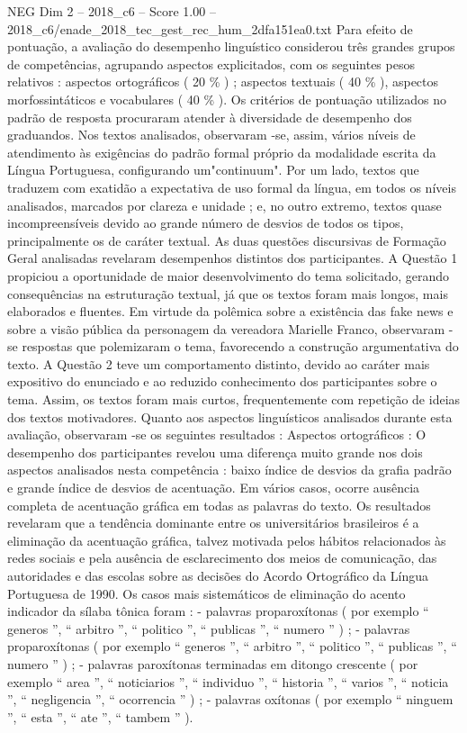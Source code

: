 \begin{textsample}{NEG Dim 2 – 2018\_c6 – Score 1.00 – 2018\_c6/enade\_2018\_tec\_gest\_rec\_hum\_2dfa151ea0.txt}
Para efeito de pontuação, a avaliação do desempenho linguístico considerou três grandes grupos de competências, agrupando aspectos explicitados, com os seguintes pesos relativos : aspectos ortográficos ( 20 \% ) ; aspectos textuais ( 40 \% ), aspectos morfossintáticos e vocabulares ( 40 \% ).
Os critérios de pontuação utilizados no padrão de resposta procuraram atender à diversidade de desempenho dos graduandos.
Nos textos analisados, observaram -se, assim, vários níveis de atendimento às exigências do padrão formal próprio da modalidade escrita da Língua Portuguesa, configurando um"continuum".
Por um lado, textos que traduzem com exatidão a expectativa de uso formal da língua, em todos os níveis analisados, marcados por clareza e unidade ; e, no outro extremo, textos quase incompreensíveis devido ao grande número de desvios de todos os tipos, principalmente os de caráter textual.
As duas questões discursivas de Formação Geral analisadas revelaram desempenhos distintos dos participantes.
A Questão 1 propiciou a oportunidade de maior desenvolvimento do tema solicitado, gerando consequências na estruturação textual, já que os textos foram mais longos, mais elaborados e fluentes.
Em virtude da polêmica sobre a existência das fake news e sobre a visão pública da personagem da vereadora Marielle Franco, observaram -se respostas que polemizaram o tema, favorecendo a construção argumentativa do texto.
A Questão 2 teve um comportamento distinto, devido ao caráter mais expositivo do enunciado e ao reduzido conhecimento dos participantes sobre o tema.
Assim, os textos foram mais curtos, frequentemente com repetição de ideias dos textos motivadores.
Quanto aos aspectos linguísticos analisados durante esta avaliação, observaram -se os seguintes resultados : Aspectos ortográficos : O desempenho dos participantes revelou uma diferença muito grande nos dois aspectos analisados nesta competência : baixo índice de desvios da grafia padrão e grande índice de desvios de acentuação.
Em vários casos, ocorre ausência completa de acentuação gráfica em todas as palavras do texto.
Os resultados revelaram que a tendência dominante entre os universitários brasileiros é a eliminação da acentuação gráfica, talvez motivada pelos hábitos relacionados às redes sociais e pela ausência de esclarecimento dos meios de comunicação, das autoridades e das escolas sobre as decisões do Acordo Ortográfico da Língua Portuguesa de 1990.
Os casos mais sistemáticos de eliminação do acento indicador da sílaba tônica foram : - palavras proparoxítonas ( por exemplo “ generos ”, “ arbitro ”, “ politico ”, “ publicas ”, “ numero ” ) ; - palavras proparoxítonas ( por exemplo “ generos ”, “ arbitro ”, “ politico ”, “ publicas ”, “ numero ” ) ; - palavras paroxítonas terminadas em ditongo crescente ( por exemplo “ area ”, “ noticiarios ”, “ individuo ”, “ historia ”, “ varios ”, “ noticia ”, “ negligencia ”, “ ocorrencia ” ) ; - palavras oxítonas ( por exemplo “ ninguem ”, “ esta ”, “ ate ”, “ tambem ” ).

\end{textsample}
